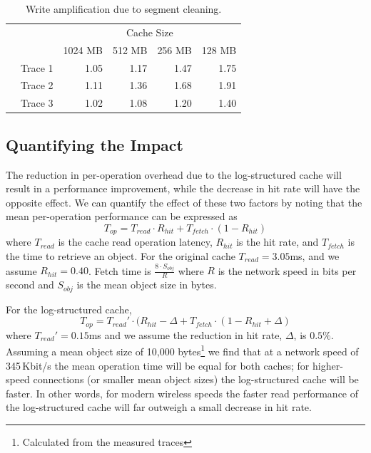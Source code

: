 \documentclass[letterpaper,twocolumn,10pt]{article}
\begin{document}
\vspace{30 mm}

\begin{table}[h]
{\footnotesize
\begin{tabular}{llrrrr}
\cline{2-6}
 &  & \multicolumn{4}{c}{Cache Size}                                                                                     \\ \cline{2-6} 
 &        & \multicolumn{1}{l}{1024 MB} & \multicolumn{1}{l}{512 MB} & \multicolumn{1}{l}{256 MB} & \multicolumn{1}{l}{128 MB} \\
 & Trace 1      & 1.05                        & 1.17                       & 1.47                       & 1.75                      \\
 & Trace 2      & 1.11                        & 1.36                       & 1.68                       & 1.91                      \\
 & Trace 3      & 1.02                        & 1.08                       & 1.20                       & 1.40                      \\ \cline{2-6} 
\end{tabular}
}
\label{table:write-amplification}
\caption{Write amplification due to segment cleaning.}
\label{tab:skips}
\end{table}

\subsection{Quantifying the Impact}
The reduction in per-operation overhead due to the log-structured cache will
result in a  performance improvement, while the decrease in hit rate will have
the opposite effect. We can quantify the effect of these two factors by noting
that the mean per-operation performance can be expressed as
\begin{equation}
T_{op} = T_{read}\cdot R_{hit} + T_{fetch}\cdot (1-R_{hit})
\end{equation}
where $T_{read}$ is the cache read operation latency, $R_{hit}$ is the hit rate,
and $T_{fetch}$ is the time to retrieve an object. For the original cache 
$T_{read}=3.05$ms, and we assume $R_{hit}=0.40$. Fetch time is $\frac{8\cdot S_{obj}}{R}$
where $R$ is the network speed in bits per second and $S_{obj}$ is the mean
object size in bytes.

For the log-structured cache, 
\begin{equation}
T_{op} = T_{read}'\cdot (R_{hit}-\Delta + T_{fetch}\cdot (1-R_{hit}+\Delta)
\end{equation}
where $T_{read}'=0.15$ms and we assume the reduction in hit rate, $\Delta$, is $0.5\%$. 
Assuming a mean object size of 10,000 bytes\footnote{Calculated from the
  measured traces} we find that at a network speed of
345\,Kbit/s the mean operation time will be equal for both caches; for
higher-speed connections (or smaller mean object sizes) the log-structured cache
will be faster. 
In other words, for modern wireless speeds the faster read performance
of the log-structured cache will far outweigh a small decrease in hit rate. 
\end{document}
